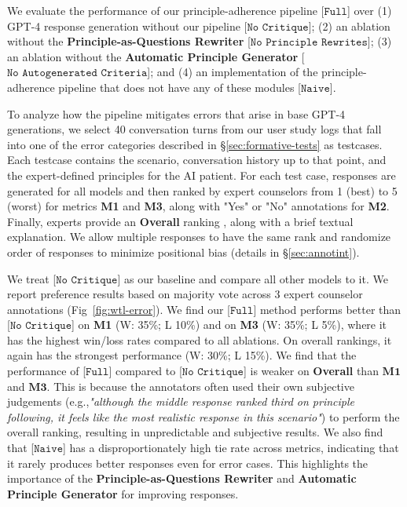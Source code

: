 \documentclass[11pt]{article}
\begin{document}
We evaluate the performance of our principle-adherence pipeline [$\texttt{Full}$] over (1) GPT-4 response generation without our pipeline [$\texttt{No Critique}$]; (2) an ablation without the \textbf{Principle-as-Questions Rewriter} [$\texttt{No Principle Rewrites}$]; (3) an ablation without the \textbf{Automatic Principle Generator} [$\texttt{No Autogenerated Criteria}$]; and (4) an implementation of the principle-adherence pipeline that does not have any of these modules [$\texttt{Naive}$]. 

To analyze how the pipeline mitigates errors that arise in base GPT-4 generations, 
we select 40 conversation turns from our user study logs that fall into one of the error categories described in \S\ref{sec:formative-tests} as testcases. 
Each testcase contains the scenario, conversation history up to that point, and the expert-defined principles for the AI patient. 
For each test case, responses are generated for all models and then ranked by expert counselors from 1 (best) to 5 (worst) for metrics \textbf{M1} and \textbf{M3}, along with "Yes" or "No" annotations for \textbf{M2}. Finally, experts provide an \textbf{Overall} ranking , along with a brief textual explanation. We allow multiple responses to have the same rank and randomize order of responses to minimize positional bias (details in \S\ref{sec:annotint}).

We treat [$\texttt{No Critique}$] as our baseline and compare all other models to it. 
We report preference results based on majority vote across 3 expert counselor annotations (Fig~\ref{fig:wtl-error}).
We find our [$\texttt{Full}$] method performs better than [$\texttt{No Critique}$] on \textbf{M1} (W: 35\%; L 10\%) and on \textbf{M3} (W: 35\%; L 5\%), where it has the highest win/loss rates compared to all ablations. On overall rankings, it again has the strongest performance (W: 30\%; L 15\%). We find that the performance of [$\texttt{Full}$] compared to [$\texttt{No Critique}$] is weaker on \textbf{Overall} than $\textbf{M1}$ and $\textbf{M3}$. This is because the annotators often used their own subjective judgements (e.g.,\emph{"although the middle response ranked third on principle following, it feels like the most realistic response in this scenario"}) to perform the overall ranking, resulting in unpredictable and subjective results. We also find that [$\texttt{Naive}$] has a disproportionately high tie rate across metrics, indicating that it rarely produces better responses even for error cases. This highlights the importance of the \textbf{Principle-as-Questions Rewriter} and \textbf{Automatic Principle Generator} for improving responses.  
\end{document}
